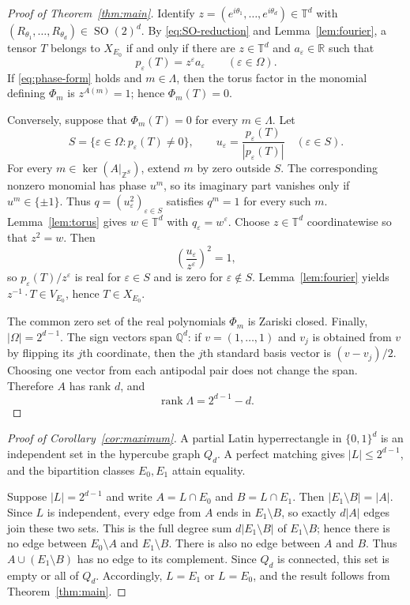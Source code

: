\documentclass[11pt]{amsart}
\theoremstyle{remark}
\newcommand{\R}{\mathbb{R}}
\newcommand{\Z}{\mathbb{Z}}
\newcommand{\Torus}{\mathbb{T}}
\newcommand{\SO}{\operatorname{SO}}
\begin{document}
\begin{proof}[Proof of Theorem~\ref{thm:main}]
Identify $z=(e^{i\theta_1},\ldots,e^{i\theta_d})\in\Torus^d$ with
$(R_{\theta_1},\ldots,R_{\theta_d})\in\SO(2)^d$. By
\eqref{eq:SO-reduction} and Lemma~\ref{lem:fourier}, a tensor $T$ belongs to
$X_{E_0}$ if and only if there are $z\in\Torus^d$ and
$a_\varepsilon\in\R$ such that
\begin{equation}\label{eq:phase-form}
p_\varepsilon(T)=z^\varepsilon a_\varepsilon
\qquad(\varepsilon\in\Omega).
\end{equation}
If \eqref{eq:phase-form} holds and $m\in\Lambda$, then the torus factor in
the monomial defining $\Phi_m$ is $z^{A(m)}=1$; hence $\Phi_m(T)=0$.

Conversely, suppose that $\Phi_m(T)=0$ for every $m\in\Lambda$. Let
\[
S=\{\varepsilon\in\Omega:p_\varepsilon(T)\ne0\},
\qquad
u_\varepsilon=\frac{p_\varepsilon(T)}{|p_\varepsilon(T)|}
\quad(\varepsilon\in S).
\]
For every $m\in\ker(A|_{\Z^S})$, extend $m$ by zero outside $S$. The
corresponding nonzero monomial has phase $u^m$, so its imaginary part
vanishes only if $u^m\in\{\pm1\}$. Thus
$q=(u_\varepsilon^2)_{\varepsilon\in S}$ satisfies $q^m=1$ for every such
$m$. Lemma~\ref{lem:torus} gives $w\in\Torus^d$ with
$q_\varepsilon=w^\varepsilon$. Choose $z\in\Torus^d$ coordinatewise so that
$z^2=w$. Then
\[
\left(\frac{u_\varepsilon}{z^\varepsilon}\right)^2=1,
\]
so $p_\varepsilon(T)/z^\varepsilon$ is real for $\varepsilon\in S$ and is
zero for $\varepsilon\notin S$. Lemma~\ref{lem:fourier} yields
$z^{-1}\cdot T\in V_{E_0}$, hence $T\in X_{E_0}$.

The common zero set of the real polynomials $\Phi_m$ is Zariski closed.
Finally, $|\Omega|=2^{d-1}$. The sign vectors span $\mathbb{Q}^d$: if
$v=(1,\ldots,1)$ and $v_j$ is obtained from $v$ by flipping its $j$th
coordinate, then the $j$th standard basis vector is $(v-v_j)/2$. Choosing
one vector from each antipodal pair does not change the span. Therefore
$A$ has rank $d$, and
\[
\operatorname{rank}\Lambda=2^{d-1}-d.
\]
\end{proof}

\begin{proof}[Proof of Corollary~\ref{cor:maximum}]
A partial Latin hyperrectangle in $\{0,1\}^d$ is an independent set in the
hypercube graph $Q_d$. A perfect matching gives $|L|\le2^{d-1}$, and the
bipartition classes $E_0,E_1$ attain equality.

Suppose $|L|=2^{d-1}$ and write $A=L\cap E_0$ and $B=L\cap E_1$. Then
$|E_1\setminus B|=|A|$. Since $L$ is independent, every edge from $A$ ends
in $E_1\setminus B$, so exactly $d|A|$ edges join these two sets. This is
the full degree sum $d|E_1\setminus B|$ of $E_1\setminus B$; hence there is
no edge between $E_0\setminus A$ and $E_1\setminus B$. There is also no edge
between $A$ and $B$. Thus $A\cup(E_1\setminus B)$ has no edge to its
complement. Since $Q_d$ is connected, this set is empty or all of $Q_d$.
Accordingly, $L=E_1$ or $L=E_0$, and the result follows from
Theorem~\ref{thm:main}.
\end{proof}
\end{document}
